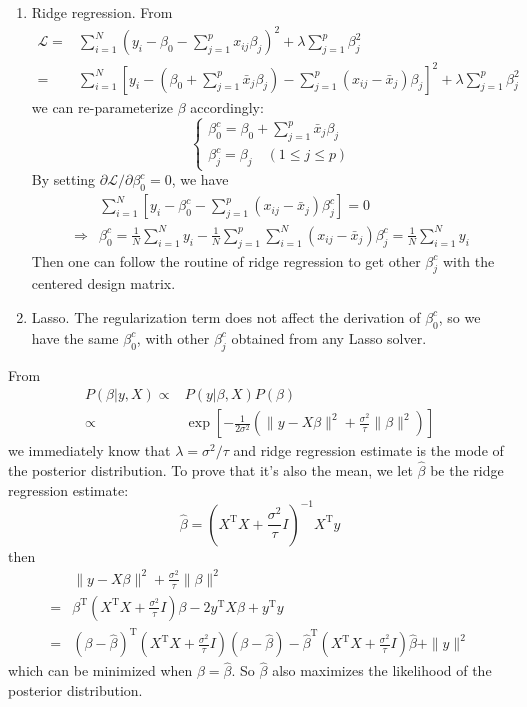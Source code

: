 \begin{sol}
\begin{enumerate}
\item Ridge regression. From
\begin{align*}
\mathcal{L} =& \sum_{i=1}^{N}\left(y_i-\beta_0-\sum_{j=1}^{p}x_{ij}\beta_j\right)^2+\lambda\sum_{j=1}^{p}\beta_j^2\\
=& \sum_{i=1}^{N}\left[y_i-\left(\beta_0+\sum_{j=1}^{p}\bar{x}_j\beta_j\right)-\sum_{j=1}^{p}\left(x_{ij}-\bar{x}_j\right)\beta_j\right]^2+\lambda\sum_{j=1}^{p}\beta_j^2
\end{align*}
we can re-parameterize $\beta$ accordingly:
\[
\begin{cases}
\beta_0^c=\beta_0+\sum_{j=1}^{p}\bar{x}_j\beta_j\\
\beta_j^c=\beta_j\quad(1\le j\le p)
\end{cases}
\]
By setting $\partial \mathcal{L}/\partial \beta^c_0=0$, we have
\begin{align*}
& \sum_{i=1}^{N}\left[y_i-\beta_0^c-\sum_{j=1}^{p}\left(x_{ij}-\bar{x}_j\right)\beta^c_j\right]=0\\
\Longrightarrow & \beta_0^c=\frac{1}{N}\sum_{i=1}^{N}y_i-\frac{1}{N}\sum_{j=1}^{p}\sum_{i=1}^{N}\left(x_{ij}-\bar{x}_j\right)\beta^c_j=\frac{1}{N}\sum_{i=1}^{N}y_i
\end{align*}
Then one can follow the routine of ridge regression to get other $\beta_j^c$ with the centered design matrix.
\item Lasso. The regularization term does not affect the derivation of $\beta_0^c$, so we have the same $\beta_0^c$, with other $\beta_j^c$ obtained from any Lasso solver.
\end{enumerate}
\end{sol}

\begin{sol}
From
\begin{align*}
P(\beta\vert y,X) \propto & P(y\vert\beta,X)P(\beta)\\
\propto& \exp\left[-\frac{1}{2\sigma^2}\left(\|y-X\beta\|^2+\frac{\sigma^2}{\tau}\|\beta\|^2\right)\right]
\end{align*}
we immediately know that $\lambda=\sigma^2/\tau$ and ridge regression estimate is the mode of the posterior distribution. To prove that it's also the mean, we let $\hat{\beta}$ be the ridge regression estimate:
\[
\hat{\beta}=\left(X^\mathrm{T}X+\frac{\sigma^2}{\tau}I\right)^{-1}X^\mathrm{T}y
\]
then
\begin{align*}
& \|y-X\beta\|^2+\frac{\sigma^2}{\tau}\|\beta\|^2 \\
=& \beta^\mathrm{T}\left(X^\mathrm{T}X+\frac{\sigma^2}{\tau}I\right)\beta - 2y^\mathrm{T}X\beta + y^\mathrm{T}y\\
=& (\beta-\hat{\beta})^\mathrm{T}\left(X^\mathrm{T}X+\frac{\sigma^2}{\tau}I\right)(\beta-\hat{\beta})-\hat{\beta}^\mathrm{T}\left(X^\mathrm{T}X+\frac{\sigma^2}{\tau}I\right)\hat{\beta}+\|y\|^2
\end{align*}
which can be minimized when $\beta=\hat{\beta}$. So $\hat{\beta}$ also maximizes the likelihood of the posterior distribution.
\end{sol}

